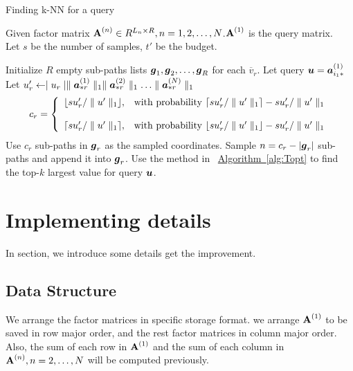 \documentclass{article}
\newcommand{\V}[1]{{\bm{{\MakeLowercase{#1}}}}}%
\newcommand{\VnC}[3]{\V{#1}^{(#2)}_{#3}}%
\newcommand{\Vacol}[1]{\V{a}^{(#1)}_{*r}}
\newcommand{\M}[1]{{\bm{\mathbf{\MakeUppercase{#1}}}}}%
\newcommand{\Mn}[2]{\M{#1}^{(#2)}}%
\newcommand{\norm}[2]{\parallel#1\parallel_{#2}}
\newcommand{\Alg}[1]{\hyperref[alg:#1]{Algorithm~\ref*{alg:#1}}}
\begin{document}
\begin{algorithm}[t]
    \caption{Finding k-NN for a query}
    \label{alg:QuerySampling}
        Given factor matrix $\M{A}^{(n)}\in R^{L_n\times R}, n = 1,2,\ldots,N$.$\M{A}^{(1)}$ is the query matrix.\\
        Let $s$ be the number of samples, $t'$ be the budget.
    \begin{algorithmic}[1]
    \State Initialize $R$ empty sub-paths lists $\V{g}_1,\V{g}_2,\ldots,\V{g}_R$ for each $\overline{v}_r$.
    \State Let query $\V{u}=\VnC{a}{1}{i_1*}$
    \State Let $u'_r \leftarrow \mid u_r\mid \norm{\Vacol{1}}{1} \norm{\Vacol{2}}{1} \ldots \norm{\Vacol{N}}{1}$
    \EndFor
    \State
    \begin{equation*}c_r=
        \left\{
          \begin{array}{ll}
            \lfloor su'_r/\norm{u'}{1} \rfloor,
            & \hbox{with probability $\lceil su'_r/\norm{u'}{1} \rceil - su'_r/\norm{u'}{1}$} \\\\
            \lceil su'_r/\norm{u'}{1} \rceil,
            & \hbox{with probability $\lfloor su'_r/\norm{u'}{1} \rfloor - su'_r/\norm{u'}{1}$}
          \end{array}
        \right.
    \end{equation*}
    \EndFor
    \If {$c_r\leq |\V{g}_r|$ }
    \State Use $c_r$ sub-paths in $\V{g}_r$ as the sampled coordinates.
    \Else
    \State Sample $n = c_r - |\V{g}_r|$ sub-paths and append it into $\V{g}_r$.
    \EndIf
    \State Use the method in ~\Alg{Topt} to find the top-$k$ largest value for query $\V{u}$.
    \EndFor
    \EndFor
    \end{algorithmic}
\end{algorithm}


\section{Implementing details}
In section, we introduce some details get the improvement.
\subsection{Data Structure}
We arrange the factor matrices in specific storage format. we arrange $\Mn{A}{1}$ to be saved in row major order, and the rest factor matrices in column major order. Also, the sum of each row in $\Mn{A}{1}$ and the sum of each column in $\Mn{A}{n},n=2,\ldots,N$ will be computed previously.
\end{document}

